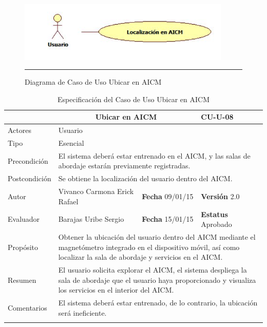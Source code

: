 \begin{figure}[htbp]
	\centering
		\includegraphics[width=0.9\textwidth]{Figuras/cuUbicarAICM.png}
		\rule{30em}{0.5pt}
	\caption[Diagrama de Caso de Uso Ubicar en AICM]{Diagrama de Caso de Uso Ubicar en AICM}
	\label{fig:cuUbicarAICM}
\end{figure}
\newpage
\begin{longtable}{|p{2.5cm}|p{6.4cm}|p{2cm}|p{2cm}|}
	\hline
		\rowcolor[RGB]{255,102,102}{Caso de Uso}&\multicolumn{2}{c}{Ubicar en AICM}&{\textbf{CU-U-08}}\\
	\hline
		{Actores}&\multicolumn{3}{p{11.2cm}|}{Usuario}\\
	\hline
		{Tipo}&\multicolumn{3}{p{11.2cm}|}{Esencial}\\
	\hline
		{Precondición}&\multicolumn{3}{p{11.2cm}|}{El sistema deberá estar entrenado en el AICM, y las salas de abordaje estarán previamente registradas.}\\
	\hline
		{Postcondición}&\multicolumn{3}{p{11.2cm}|}{Se obtiene la localización del usuario dentro del AICM.}\\
	\hline
		{Autor}&{Vivanco Carmona Erick Rafael}&{\textbf{Fecha} 09/01/15}&{\textbf{Versión} 2.0}\\
			\hline
		{Evaluador}&{Barajas Uribe Sergio}&{\textbf{Fecha} 15/01/15}&{\textbf{Estatus} Aprobado}\\
	\hline
		{Propósito}&\multicolumn{3}{p{11.2cm}|}{Obtener la ubicación del usuario dentro del AICM mediante el magnetómetro integrado en el dispositivo móvil, así como localizar la sala de abordaje y servicios en el AICM. }\\
	\hline
		{Resumen}&\multicolumn{3}{p{11.2cm}|}{El usuario solicita explorar el AICM, el sistema despliega la sala de abordaje que el usuario haya proporcionado y visualiza los servicios en el interior del AICM.}\\	
	\hline
		{Comentarios}&\multicolumn{3}{p{11.2cm}|}{El sistema deberá estar entrenado, de lo contrario, la ubicación será ineficiente.}\\
	\hline
	\caption[Especificación del Caso de Uso Ubicar en AICM]{Especificación del Caso de Uso Ubicar en AICM}
    	\label{tab:cuUbicarAICM}
\end{longtable}

